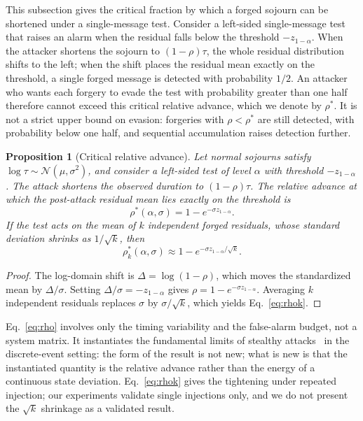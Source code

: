 \documentclass[manuscript,screen,review]{acmart}
\newtheorem{proposition}[theorem]{Proposition}%
\begin{document}
This subsection gives the critical fraction by which a forged sojourn can be shortened under a single-message test. Consider a left-sided single-message test that raises an alarm when the residual falls below the threshold $-z_{1-\alpha}$. When the attacker shortens the sojourn to $(1-\rho)\tau$, the whole residual distribution shifts to the left; when the shift places the residual mean exactly on the threshold, a single forged message is detected with probability $1/2$. An attacker who wants each forgery to evade the test with probability greater than one half therefore cannot exceed this critical relative advance, which we denote by $\rho^*$. It is not a strict upper bound on evasion: forgeries with $\rho<\rho^*$ are still detected, with probability below one half, and sequential accumulation raises detection further.

\begin{proposition}[Critical relative advance]
\label{prop:rho}
Let normal sojourns satisfy $\log\tau\sim\mathcal{N}(\mu,\sigma^2)$, and consider a left-sided test of level $\alpha$ with threshold $-z_{1-\alpha}$. The attack shortens the observed duration to $(1-\rho)\tau$. The relative advance at which the post-attack residual mean lies exactly on the threshold is
\begin{equation}
  \rho^*(\alpha,\sigma)=1-e^{-\sigma z_{1-\alpha}}.
  \label{eq:rho}
\end{equation}
If the test acts on the mean of $k$ independent forged residuals, whose standard deviation shrinks as $1/\sqrt{k}$, then
\begin{equation}
  \rho^*_k(\alpha,\sigma)\approx 1-e^{-\sigma z_{1-\alpha}/\sqrt{k}}.
  \label{eq:rhok}
\end{equation}
\end{proposition}

\begin{proof}
The log-domain shift is $\Delta=\log(1-\rho)$, which moves the standardized mean by $\Delta/\sigma$. Setting $\Delta/\sigma=-z_{1-\alpha}$ gives $\rho=1-e^{-\sigma z_{1-\alpha}}$. Averaging $k$ independent residuals replaces $\sigma$ by $\sigma/\sqrt{k}$, which yields Eq.~\eqref{eq:rhok}.
\end{proof}

Eq.~\eqref{eq:rho} involves only the timing variability and the false-alarm budget, not a system matrix. It instantiates the fundamental limits of stealthy attacks~\cite{liu2022limits} in the discrete-event setting: the form of the result is not new; what is new is that the instantiated quantity is the relative advance rather than the energy of a continuous state deviation. Eq.~\eqref{eq:rhok} gives the tightening under repeated injection; our experiments validate single injections only, and we do not present the $\sqrt{k}$ shrinkage as a validated result.
\end{document}
